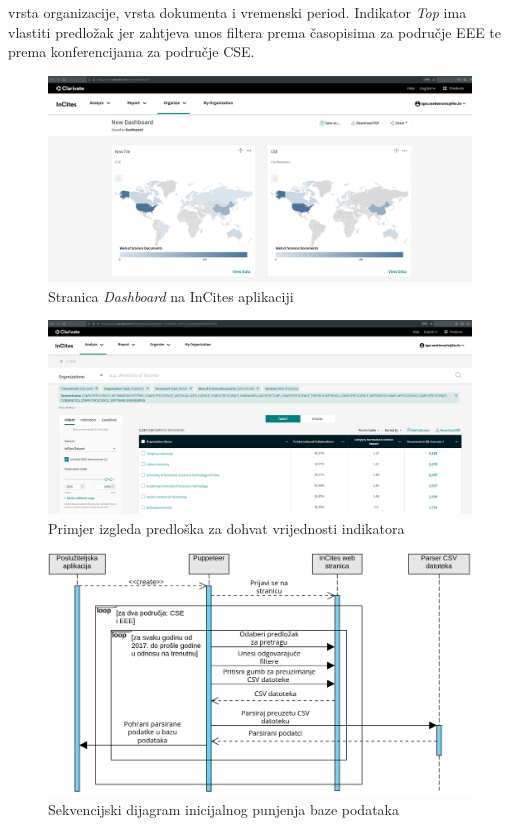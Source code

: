 \documentclass[times, utf8, zavrsni]{fer}
\begin{document}
vrsta organizacije, vrsta dokumenta i vremenski period. Indikator \emph{Top} ima vlastiti predložak jer zahtjeva unos filtera prema časopisima za područje EEE te 
prema konferencijama za područje CSE. 
\begin{figure}[htb]
    \hspace*{-2cm} 
       \includegraphics[scale=0.21]{dashboard.png} 
       \caption{Stranica \emph{Dashboard} na InCites aplikaciji}
       \label{fig:dashboard}
       \end{figure} 
\begin{figure}[htb]
        \hspace*{-2cm} 
           \includegraphics[scale=0.21]{predlozak.png} 
           \caption{Primjer izgleda predloška za dohvat vrijednosti indikatora}
           \label{fig:predlozak}
           \end{figure}  
           \FloatBarrier      
\begin{figure}[htb]
    \centering
       \includegraphics[scale=0.22]{sekvencijski.png} 
       \caption{Sekvencijski dijagram inicijalnog punjenja baze podataka}
       \label{fig:sekvencijski}
       \end{figure}
\end{document}
